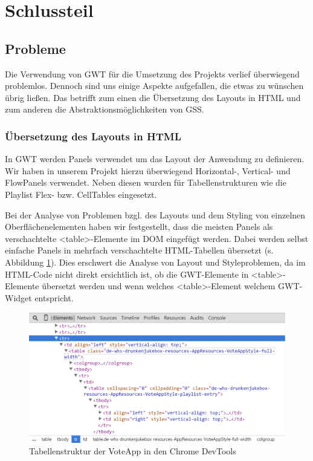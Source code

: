 \section{Schlussteil}

\subsection{Probleme}

Die Verwendung von GWT für die Umsetzung des Projekts verlief überwiegend problemlos. Dennoch sind uns einige
Aspekte aufgefallen, die etwas zu wünschen übrig ließen. Das betrifft zum einen die
Übersetzung des Layouts in HTML und zum anderen die Abstraktionsmöglichkeiten von GSS.

\subsubsection{Übersetzung des Layouts in HTML}

In GWT werden Panels verwendet um das Layout der Anwendung zu definieren. Wir haben in unserem Projekt
hierzu überwiegend Horizontal-, Vertical- und FlowPanels verwendet. Neben diesen wurden für Tabellenstrukturen wie die Playlist
Flex- bzw. CellTables eingesetzt.

Bei der Analyse von Problemen bzgl. des Layouts und dem Styling von einzelnen Oberflächenelementen haben wir
festgestellt, dass die meisten Panels als verschachtelte <table>-Elemente im DOM eingefügt werden.
Dabei werden selbst einfache Panels in mehrfach verschachtelte HTML-Tabellen übersetzt (s. Abbildung \ref{fig:Probleme-HTML-tables}). Dies erschwert die Analyse von Layout und Styleproblemen, da im HTML-Code nicht direkt ersichtlich ist, ob die GWT-Elemente in <table>-Elemente übersetzt werden und wenn welches <table>-Element welchem GWT-Widget entspricht. 

\begin{figure}[htb]
\centering
\includegraphics[width=1.0\linewidth]{Bilder/Probleme-HTML-tables}
\caption{Tabellenstruktur der VoteApp in den Chrome DevTools}
\label{fig:Probleme-HTML-tables}
\end{figure}

